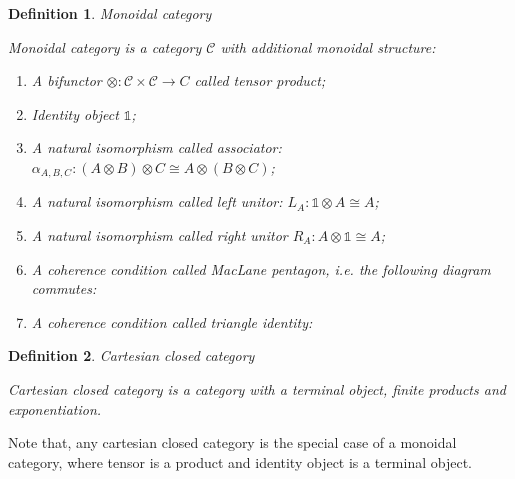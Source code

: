 \documentclass[a4paper]{article}
\newtheorem{defin}{Definition}
\begin{document}
\begin{defin} Monoidal category

  Monoidal category is a category $\mathcal{C}$ with additional monoidal structure:
  \begin{enumerate}
    \item A bifunctor $\otimes : \mathcal{C} \times \mathcal{C} \to C$ called tensor product;
    \item Identity object $\mathds{1}$;
    \item A natural isomorphism called associator: $\alpha_{A,B,C}: (A \otimes B) \otimes C \cong A \otimes (B \otimes C)$;
    \item A natural isomorphism called left unitor: $L_A : \mathds{1} \otimes A \cong A$;
    \item A natural isomorphism called right unitor $R_A : A \otimes \mathds{1} \cong A$;
    \item A coherence condition called MacLane pentagon, i.e. the following diagram commutes:

    \item A coherence condition called triangle identity:

  \end{enumerate}
\end{defin}

\begin{defin} Cartesian closed category

  Cartesian closed category is a category with a terminal object, finite products and exponentiation.
\end{defin}

Note that, any cartesian closed category is the special case of a monoidal category, where tensor is a product and identity object is a terminal object.
\end{document}

